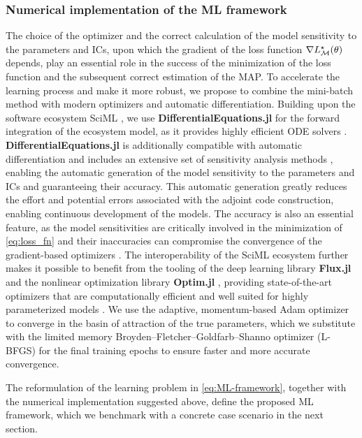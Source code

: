 \subsubsection{Numerical implementation of the ML framework}

The choice of the optimizer and the correct calculation of the model sensitivity to the parameters and ICs, upon which the gradient of the loss function $\nabla L^\star_{\mathcal{M}}(\theta)$ depends, play an essential role in the success of the minimization of the loss function and the subsequent correct estimation of the MAP. 
% 
To accelerate the learning process and make it more robust, we propose to combine the mini-batch method with modern optimizers and automatic differentiation.
%
Building upon the software ecosystem SciML \citep{Rackauckas2020a}, we use \textbf{DifferentialEquations.jl} for the forward integration of the ecosystem model, as it provides highly efficient ODE solvers \citep{Rackauckas2017}.  \textbf{DifferentialEquations.jl} is additionally compatible with automatic differentiation and includes an extensive set of sensitivity analysis methods \citep{Ma2021}, enabling the automatic generation of the model sensitivity to the parameters and ICs and guaranteeing their accuracy. This automatic generation greatly reduces the effort and potential errors associated with the adjoint code construction, enabling continuous development of the models. The accuracy is also an essential feature, as the model sensitivities are critically involved in the minimization of \cref{eq:loss_fn} and their inaccuracies can compromise the convergence of the gradient-based optimizers \citep{Gholaminejad2019}.
%
The interoperability of the SciML ecosystem further makes it possible to benefit from the tooling of the deep learning library \textbf{Flux.jl} and the nonlinear optimization library \textbf{Optim.jl} \citep{KMogensen2018}, providing state-of-the-art optimizers that are computationally efficient and well suited for highly parameterized models \citep{Ruder2016}.
% 
We use the adaptive, momentum-based Adam optimizer \citep{Kingma2014} to converge in the basin of attraction of the true parameters, which we substitute with the limited memory Broyden–Fletcher–Goldfarb–Shanno optimizer (L-BFGS) \citep{Liu1989} for the final training epochs to ensure faster and more accurate convergence.

The reformulation of the learning problem in \cref{eq:ML-framework}, together with the numerical implementation suggested above, define the proposed ML framework, which we benchmark with a concrete case scenario in the next section.

